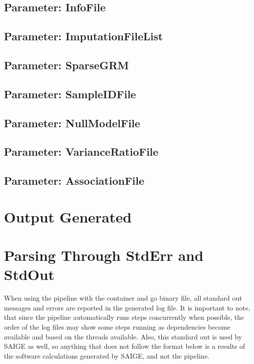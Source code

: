 \documentclass[letterpaper,10pt,english]{sphinxmanual}
\begin{document}
\subsection{Parameter: InfoFile}
\label{\detokenize{fileFormats:parameter-infofile}}

\subsection{Parameter: ImputationFileList}
\label{\detokenize{fileFormats:parameter-imputationfilelist}}

\subsection{Parameter: SparseGRM}
\label{\detokenize{fileFormats:parameter-sparsegrm}}

\subsection{Parameter: SampleIDFile}
\label{\detokenize{fileFormats:parameter-sampleidfile}}

\subsection{Parameter: NullModelFile}
\label{\detokenize{fileFormats:parameter-nullmodelfile}}

\subsection{Parameter: VarianceRatioFile}
\label{\detokenize{fileFormats:parameter-varianceratiofile}}

\subsection{Parameter: AssociationFile}
\label{\detokenize{fileFormats:parameter-associationfile}}

\section{Output Generated}
\label{\detokenize{output:output-generated}}\label{\detokenize{output::doc}}

\section{Parsing Through StdErr and StdOut}
\label{\detokenize{parsingStdErrOut:parsing-through-stderr-and-stdout}}\label{\detokenize{parsingStdErrOut::doc}}
When using the pipeline with the container and go binary file, all standard out messages and errors are reported in the generated log file.  It is important to note, that since the pipeline automatically runs steps concurrently when possible, the order of the log files may show some steps running as dependencies become available and based on the threads available.  Also, this standard out is used by SAIGE as well, so anything that does not follow the format below is a results of the software calculations generated by SAIGE, and not the pipeline.
\end{document}
